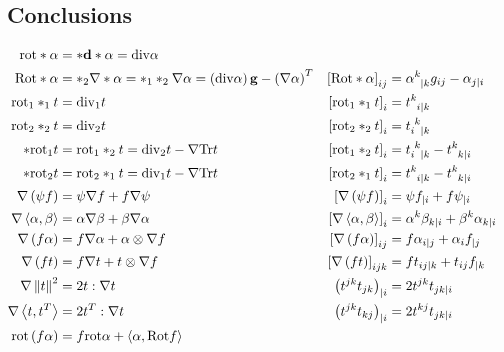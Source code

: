 \documentclass[a4paper,10pt]{scrartcl}
\newcommand{\exd}{\mathbf{d}}
\newcommand{\Tr}{\mathrm{Tr}}
\newcommand{\rot}{\mathrm{rot}}
\renewcommand{\div}{\mathrm{div}}
\newcommand{\Rot}{\mathrm{Rot}}
\newcommand{\gb}{\mathbf{g}}
\begin{document}
  \subsection{Conclusions}
  \begin{align*}
    \rot*\alpha &= *\exd*\alpha = \div\alpha\\
    \Rot*\alpha &= *_{2}\nabla*\alpha = *_{1}*_{2}\nabla\alpha = \left( \div\alpha \right)\gb - \left( \nabla\alpha \right)^{T}
                & \left[ \Rot*\alpha  \right]_{ij} &= \tensor{\alpha}{^{k}_{|k}}g_{ij} - \alpha_{j|i}\\
    \rot_{1}*_{1}t &= \div_{1} t
                &\left[ \rot_{1}*_{1}t \right]_{i} &= \tensor{t}{^{k}_{i|k}}\\
    \rot_{2}*_{2}t &= \div_{2} t
                &\left[ \rot_{2}*_{2}t \right]_{i} &= \tensor{t}{_{i}^{k}_{|k}}\\
    *\rot_{1} t &= \rot_{1}*_{2}t = \div_{2} t - \nabla\Tr t
                &\left[ \rot_{1}*_{2}t \right]_{i} &= \tensor{t}{_{i}^{k}_{|k}} - \tensor{t}{^{k}_{k|i}}\\
    *\rot_{2} t &= \rot_{2}*_{1}t = \div_{1} t - \nabla\Tr t
                &\left[ \rot_{2}*_{1}t \right]_{i} &= \tensor{t}{^{k}_{i|k}} - \tensor{t}{^{k}_{k|i}}\\
    \nabla\left( \psi f \right) &= \psi\nabla f + f\nabla\psi
                &\left[ \nabla\left( \psi f \right) \right]_{i} &= \psi f_{|i} + f \psi_{|i}\\
    \nabla\left\langle \alpha, \beta \right\rangle &= \alpha\nabla\beta + \beta\nabla\alpha
                &\left[ \nabla\left\langle \alpha, \beta \right\rangle \right]_{i} &= \alpha^{k}\beta_{k|i} + \beta^{k}\alpha_{k|i}\\
    \nabla\left( f\alpha \right) &= f\nabla\alpha + \alpha\otimes\nabla f
                &\left[ \nabla\left( f\alpha \right) \right]_{ij} &= f\alpha_{i|j} + \alpha_{i}f_{|j}\\
    \nabla\left( f t \right) &= f\nabla t + t \otimes\nabla f
                &\left[ \nabla\left( f t \right) \right]_{ijk} &= f t_{ij|k} + t_{ij}f_{|k}\\
    \nabla\left\| t \right\|^{2} &= 2t:\nabla t
                &\left( t^{jk}t_{jk} \right)_{|i} &= 2t^{jk}t_{jk|i}\\
    \nabla\left\langle t , t^{T} \right\rangle &= 2t^{T}:\nabla t
                &\left( t^{jk}t_{kj} \right)_{|i} &= 2t^{kj}t_{jk|i}\\
    \rot\left( f\alpha \right) &= f\rot\alpha + \left\langle \alpha, \Rot f \right\rangle

\end{align*}
\end{document}
